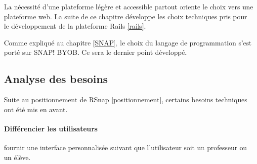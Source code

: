 La nécessité d'une plateforme légère et accessible partout oriente le choix vers une plateforme web. La suite de ce chapitre développe les choix techniques pris pour le développement de la plateforme Rails \ref{rails}. 

Comme expliqué au chapitre \ref{SNAP}, le choix du langage de programmation s'est porté sur SNAP! BYOB.  Ce sera le dernier point développé.



\subsection{Analyse des besoins} %
Suite au positionnement de RSnap \ref{positionnement}, certains besoins techniques ont été mis en avant.


\paragraph{Différencier les utilisateurs} fournir une interface personnalisée suivant que l'utilisateur soit un professeur ou un élève.
